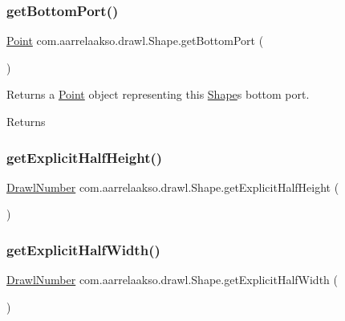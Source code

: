 \subsubsection{\texorpdfstring{get\+Bottom\+Port()}{getBottomPort()}}
{\footnotesize\ttfamily \hyperlink{classcom_1_1aarrelaakso_1_1drawl_1_1_point}{Point} com.\+aarrelaakso.\+drawl.\+Shape.\+get\+Bottom\+Port (\begin{DoxyParamCaption}{ }\end{DoxyParamCaption})}



Returns a \hyperlink{classcom_1_1aarrelaakso_1_1drawl_1_1_point}{Point} object representing this \hyperlink{classcom_1_1aarrelaakso_1_1drawl_1_1_shape}{Shape}\textquotesingle{}s bottom port. 

\begin{DoxyReturn}{Returns}

\end{DoxyReturn}
\mbox{\label{classcom_1_1aarrelaakso_1_1drawl_1_1_shape_a7207aa8ba07ed18af81fb9d92a979cd6}} 
\subsubsection{\texorpdfstring{get\+Explicit\+Half\+Height()}{getExplicitHalfHeight()}}
{\footnotesize\ttfamily \hyperlink{classcom_1_1aarrelaakso_1_1drawl_1_1_drawl_number}{Drawl\+Number} com.\+aarrelaakso.\+drawl.\+Shape.\+get\+Explicit\+Half\+Height (\begin{DoxyParamCaption}{ }\end{DoxyParamCaption})\hspace{0.3cm}{\ttfamily [protected]}}

\mbox{\label{classcom_1_1aarrelaakso_1_1drawl_1_1_shape_af952f32cb1706da71c9cb75916f4d665}} 
\subsubsection{\texorpdfstring{get\+Explicit\+Half\+Width()}{getExplicitHalfWidth()}}
{\footnotesize\ttfamily \hyperlink{classcom_1_1aarrelaakso_1_1drawl_1_1_drawl_number}{Drawl\+Number} com.\+aarrelaakso.\+drawl.\+Shape.\+get\+Explicit\+Half\+Width (\begin{DoxyParamCaption}{ }\end{DoxyParamCaption})\hspace{0.3cm}{\ttfamily [protected]}}

